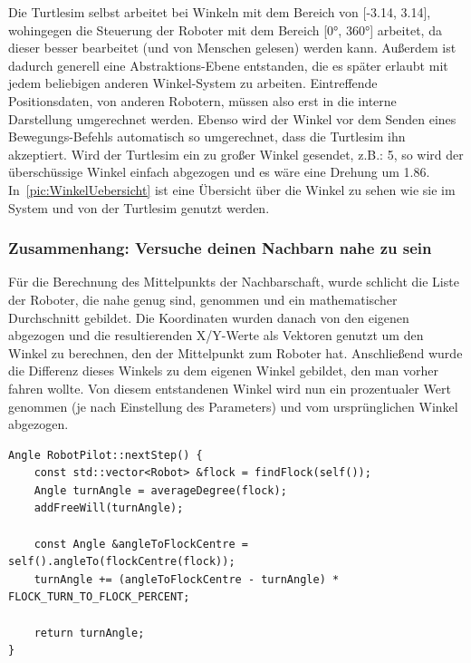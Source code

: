 Die Turtlesim selbst arbeitet bei Winkeln mit dem Bereich von [-3.14, 3.14], wohingegen die Steuerung der Roboter mit dem Bereich [0°, 360°] arbeitet, da dieser besser bearbeitet (und von Menschen gelesen) werden kann. Außerdem ist dadurch generell eine Abstraktions-Ebene entstanden, die es später erlaubt mit jedem beliebigen anderen Winkel-System zu arbeiten.
Eintreffende Positionsdaten, von anderen Robotern, müssen also erst in die interne Darstellung umgerechnet werden. Ebenso wird der Winkel vor dem Senden eines Bewegungs-Befehls automatisch so umgerechnet, dass die Turtlesim ihn akzeptiert. Wird der Turtlesim ein zu großer Winkel gesendet, z.B.: 5, so wird der überschüssige Winkel einfach abgezogen und es wäre eine Drehung um 1.86. In~\autoref{pic:WinkelUebersicht} ist eine Übersicht über die Winkel zu sehen wie sie im System und von der Turtlesim genutzt werden.

%
%
%

 
\subsubsection*{Zusammenhang: Versuche deinen Nachbarn nahe zu sein}

Für die Berechnung des Mittelpunkts der Nachbarschaft, wurde schlicht die Liste der Roboter, die nahe genug sind, genommen und ein mathematischer Durchschnitt gebildet. Die Koordinaten wurden danach von den eigenen abgezogen und die resultierenden X/Y-Werte als Vektoren genutzt um den Winkel zu berechnen, den der Mittelpunkt zum Roboter hat. Anschließend wurde die Differenz dieses Winkels zu dem eigenen Winkel gebildet, den man vorher fahren wollte.
Von diesem entstandenen Winkel wird nun ein prozentualer Wert genommen (je nach Einstellung des Parameters) und vom ursprünglichen Winkel abgezogen.

\begin{lstlisting}[style=cpp, title=Berechnung des Fahrtwinkels]
Angle RobotPilot::nextStep() {
	const std::vector<Robot> &flock = findFlock(self());
	Angle turnAngle = averageDegree(flock);
	addFreeWill(turnAngle);

	const Angle &angleToFlockCentre = self().angleTo(flockCentre(flock));
	turnAngle += (angleToFlockCentre - turnAngle) * FLOCK_TURN_TO_FLOCK_PERCENT;

	return turnAngle;
}
\end{lstlisting}

